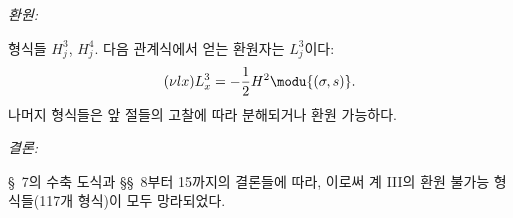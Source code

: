 
\noindent\emph{환원:}

형식들 $H_j^3$, $H_j^4$. 다음 관계식에서 얻는 환원자는 $L_j^3$이다:
\[
(\nu lx)L_x^3=-\frac12H^2\modu{(\sigma,s)}.
\]
나머지 형식들은 앞 절들의 고찰에 따라 분해되거나 환원 가능하다.

\noindent\emph{결론:}

\S\ 7의 수축 도식과 \S\S\ 8부터 15까지의 결론들에 따라, 이로써 계 III의 환원 불가능 형식들(117개 형식)이 모두 망라되었다.
